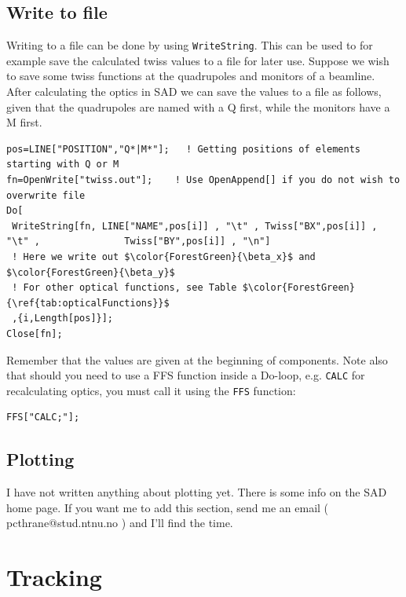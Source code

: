 \documentclass{article}
\begin{document}
\subsection{Write to file}
Writing to a file can be done by using \texttt{WriteString}. This can be used to for example save the calculated twiss values to a file for later use. Suppose we wish to save some twiss functions at the quadrupoles and monitors of a beamline.  After calculating the optics in SAD we can save the values to a file as follows, given that the quadrupoles are named with a Q first, while the monitors have a M first.
\begin{lstlisting}[mathescape=true]
pos=LINE["POSITION","Q*|M*"];	! Getting positions of elements starting with Q or M
fn=OpenWrite["twiss.out"];    ! Use OpenAppend[] if you do not wish to overwrite file
Do[                                    
 WriteString[fn, LINE["NAME",pos[i]] , "\t" , Twiss["BX",pos[i]] , "\t" ,               Twiss["BY",pos[i]] , "\n"]
 ! Here we write out $\color{ForestGreen}{\beta_x}$ and $\color{ForestGreen}{\beta_y}$
 ! For other optical functions, see Table $\color{ForestGreen}{\ref{tab:opticalFunctions}}$
 ,{i,Length[pos]}];
Close[fn];
\end{lstlisting}
Remember that the values are given at the beginning of components.
Note also that should you need to use a FFS function inside a Do-loop, e.g. \texttt{CALC} for recalculating optics, you must call it using the \texttt{FFS} function:
\begin{lstlisting}
FFS["CALC;"];
\end{lstlisting}


\subsection{Plotting}
I have not written anything about plotting yet. There is some info on the SAD home page. If you want me to add this section, send me an email ( pcthrane@stud.ntnu.no ) and I'll find the time.


\section{Tracking}
\end{document}

